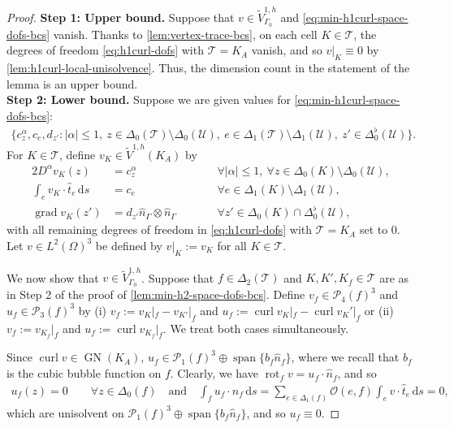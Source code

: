 \documentclass{mcom-l}
\theoremstyle{definition}
\theoremstyle{remark}
\numberwithin{equation}{section}
\newcommand{\unitvec}[1]{\hat{#1}}
\renewcommand{\d}[1]{\,\mathrm{d}{#1}}
\DeclareMathOperator{\GN}{GN}
\DeclareMathOperator{\curl}{curl}
\DeclareMathOperator{\grad}{grad}
\DeclareMathOperator{\rot}{rot}
\DeclareMathOperator{\spann}{span}
\newcommand{\mesh}[0]{\mathcal{T}}
\newcommand{\boundarymesh}[0]{\mathcal{U}}
\begin{document}
\begin{proof}
	\textbf{Step 1: Upper bound. }
	Suppose that $v \in \tilde{V}^{1, h}_{\Gamma_0}$ and 
	\cref{eq:min-h1curl-space-dofs-bcs}
	vanish. Thanks to \cref{lem:vertex-trace-bcs}, 
	on each cell $K \in \mesh$, the degrees of freedom 
	\cref{eq:h1curl-dofs} with $\mesh = K_A$ vanish, and so $v|_K \equiv 0$
	by \cref{lem:h1curl-local-unisolvence}. Thus, the dimension count
	in the statement of the lemma is an upper bound. \\
	
	\noindent \textbf{Step 2: Lower bound. } Suppose we are given values for 
	\cref{eq:min-h1curl-space-dofs-bcs}: 
	\begin{align}
		\label{eq:proof:min-h1curl-space-dofs-bcs}
		\{c_z^{\alpha}, c_e, d_{z'} : |\alpha| \leq 1, 
		\ z \in \Delta_0(\mesh) \setminus \Delta_0(\boundarymesh), 
		\ e \in \Delta_1(\mesh) \setminus \Delta_1(\boundarymesh),
		\ z' \in \Delta_0^{\flat}(\boundarymesh)\}.
	\end{align}
	For $K \in \mesh$, define $v_K \in \tilde{V}^{1, h}(K_A)$ by 
	\begin{alignat*}{2}
		D^{\alpha} v_K(z) &= c_z^{\alpha} \qquad 
		& &\forall |\alpha| \leq 1, \ \forall z \in \Delta_0(K)
		\setminus \Delta_0(\boundarymesh), \\
		\int_e v_K \cdot \unitvec{t}_e \d{s} &= c_e \qquad 
		& &\forall e \in \Delta_1(K)
		\setminus \Delta_1(\boundarymesh), \\
		\grad v_K(z') &= d_{z'} \unitvec{n}_{\Gamma} \otimes \unitvec{n}_{\Gamma}
		\qquad 
		& &\forall z' \in \Delta_0(K) \cap \Delta_0^{\flat}(\boundarymesh),
	\end{alignat*}
	with all remaining degrees of freedom  
	in \cref{eq:h1curl-dofs} with $\mesh = K_A$ set to 0.
	Let $v \in L^2(\Omega)^3$ be defined by $v|_K := v_K$ for all 
	$K \in \mesh$. 
	
	We now show that $v \in \tilde{V}^{1, h}_{\Gamma_0}$.
	Suppose that $f \in \Delta_2(\mesh)$ and $K, K', K_f \in \mesh$ are as in 
	Step 2 of the proof of \cref{lem:min-h2-space-dofs-bcs}. 
	Define $v_f \in \mathcal{P}_4(f)^3$
	and $u_f \in \mathcal{P}_3(f)^3$ by (i) $v_f := v_K|_f - v_{K'}|_f$ and 
	$u_f := \curl v_K|_f - \curl v_K'|_f$ or 
	(ii) $v_f := v_{K_f}|_f$ and $u_f := \curl v_{K_f}|_f$. We treat both 
	cases simultaneously.
	
	Since $\curl v \in \GN(K_A)$,
	$u_f \in \mathcal{P}_1(f)^3 \oplus \spann\{ b_f \unitvec{n}_f \}$,
	where we recall that $b_f$ is the cubic bubble 
	function on $f$. Clearly, we have $\rot_f v = u_f \cdot \unitvec{n}_f$,
	and so
	\begin{align*}
		u_f(z) = 0 \qquad \forall z \in \Delta_0(f)
		\quad \text{and} \quad 
		\int_f u_f \cdot \unitvec{n}_f \d{s} %
		= \sum_{e \in \Delta_1(f)} \mathcal{O}(e, f) 
		\int_{e} v \cdot \unitvec{t}_{e} \d{s} = 0,
	\end{align*}
	which are unisolvent on 
	$\mathcal{P}_1(f)^3 \oplus \spann\{ b_f \unitvec{n}_f \}$, and so 
	$u_f \equiv 0$.
	

\end{proof}
\end{document}
